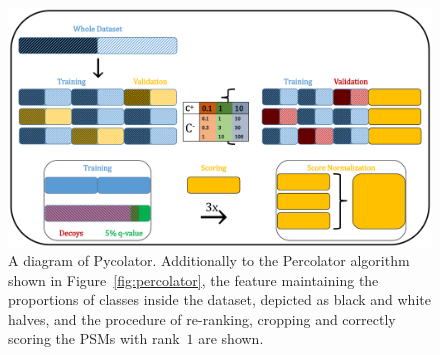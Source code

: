 \begin{figure}
	\normalsize
	\centering
	\includegraphics[width = \textwidth, page = 3]{figures/Pycolator_diagram.pdf}
	\caption[Pycolator scheme]{A diagram of Pycolator. Additionally to the Percolator algorithm shown in Figure~\ref{fig:percolator}, the feature maintaining the proportions of classes inside the dataset, depicted as black and white halves, and the procedure of re-ranking, cropping and correctly scoring the PSMs with rank~$1$ are shown.}
	\label{fig:pycolator}
\end{figure}
\renewcommand{\baselinestretch}{1}
